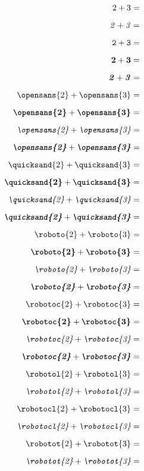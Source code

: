 \documentclass[a4paper,12pt]{article}
\begin{document}
\begin{multicols}{5}
\begin{align*}
\end{align*}
\begin{align*}
\mathrm{2}+\mathrm{3}&=\\[0.6em]
\mathit{2}+\mathit{3}&=\\[0.6em]
\mathtt{2}+\mathtt{3}&=\\[0.6em]
\mathbf{2}+\mathbf{3}&=\\[0.6em]
\textbf{\textit{2}}+\textbf{\textit{3}}&=\\[0.6em]
\textrm{\opensans{2}}+\textrm{\opensans{3}}&=\\[0.6em]
\textbf{\opensans{2}}+\textbf{\opensans{3}}&=\\[0.6em]
\textit{\opensans{2}}+\textit{\opensans{3}}&=\\[0.6em]
\textbf{\textit{\opensans{2}}}+\textbf{\textit{\opensans{3}}}&=\\[0.6em]
\textrm{\quicksand{2}}+\textrm{\quicksand{3}}&=\\[0.6em]
\textbf{\quicksand{2}}+\textbf{\quicksand{3}}&=\\[0.6em]
\textit{\quicksand{2}}+\textit{\quicksand{3}}&=\\[0.6em]
\textbf{\textit{\quicksand{2}}}+\textbf{\textit{\quicksand{3}}}&=\\[0.6em]
\textrm{\roboto{2}}+\textrm{\roboto{3}}&=\\[0.6em]
\textbf{\roboto{2}}+\textbf{\roboto{3}}&=\\[0.6em]
\textit{\roboto{2}}+\textit{\roboto{3}}&=\\[0.6em]
\textbf{\textit{\roboto{2}}}+\textbf{\textit{\roboto{3}}}&=\\[0.6em]
\textrm{\robotoc{2}}+\textrm{\robotoc{3}}&=\\[0.6em]
\textbf{\robotoc{2}}+\textbf{\robotoc{3}}&=\\[0.6em]
\textit{\robotoc{2}}+\textit{\robotoc{3}}&=\\[0.6em]
\textbf{\textit{\robotoc{2}}}+\textbf{\textit{\robotoc{3}}}&=\\[0.6em]
\textrm{\robotol{2}}+\textrm{\robotol{3}}&=\\[0.6em]
\textit{\robotol{2}}+\textit{\robotol{3}}&=\\[0.6em]
\textrm{\robotocl{2}}+\textrm{\robotocl{3}}&=\\[0.6em]
\textit{\robotocl{2}}+\textit{\robotocl{3}}&=\\[0.6em]
\textrm{\robotot{2}}+\textrm{\robotot{3}}&=\\[0.6em]
\textit{\robotot{2}}+\textit{\robotot{3}}&=\\[0.6em]

\end{align*}
\end{multicols}
\end{document}
